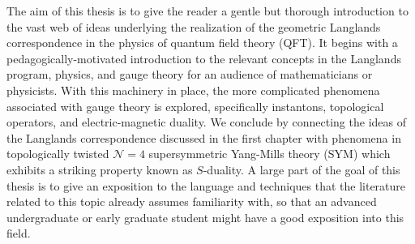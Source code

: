 The aim of this thesis is to give the reader a gentle but thorough introduction to the vast web of ideas underlying the realization of the geometric Langlands correspondence in the physics of quantum field theory (QFT). It begins with a pedagogically-motivated introduction to the relevant concepts in the Langlands program, physics, and gauge theory for an audience of mathematicians or physicists. With this machinery in place, the more complicated phenomena associated with gauge theory is explored, specifically instantons, topological operators, and electric-magnetic duality. We conclude by connecting the ideas of the Langlands correspondence discussed in the first chapter with phenomena in topologically twisted $\mathcal N = 4$ supersymmetric Yang-Mills theory (SYM) which exhibits a striking property known as $S$-duality. A large part of the goal of this thesis is to give an exposition to the language and techniques that the literature related to this topic already assumes familiarity with, so that an advanced undergraduate or early graduate student might have a good exposition into this field. 